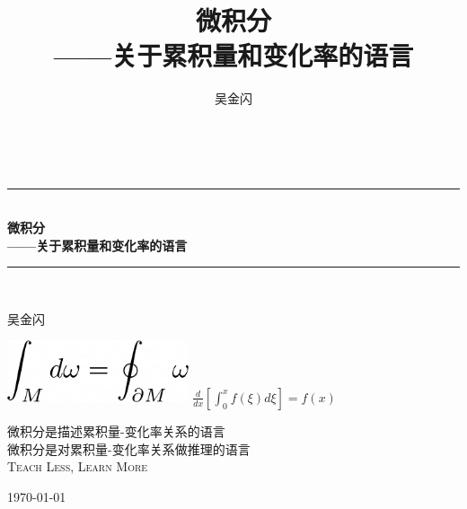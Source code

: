 \documentclass{ctexbook}
\newcommand{\note}[1]{{\color{blue}{#1}}}
\newcommand{\HRule}{\rule{\linewidth}{0.5mm}}
\begin{document}
\title{微积分\\
——关于累积量和变化率的语言}
\author{吴金闪}

\begin{titlepage}
\begin{center}

~

\HRule \\[0.4cm]
{ \huge \bfseries 微积分\\
——关于累积量和变化率的语言 \\[0.4cm] }
\HRule \\[0.5cm]

\begin{center} \Large
吴金闪
\end{center}
\vspace{1cm}
	
\includegraphics[width=0.4\textwidth]{figure/Stokes} \hspace{2cm} $\frac{d}{dx}\left[\int_{0}^{x}f\left(\xi\right)d\xi\right]=f\left(x\right)$
\note{插图化成一个人嘴里说出来这个Stokes公式}

\vspace{1cm}

\textsc{\Large 微积分是描述累积量-变化率关系的语言}\\[0.5cm]

\textsc{\Large 微积分是对累积量-变化率关系做推理的语言}\\[0.5cm]
	
\textsc{\Large Teach Less, Learn More}\\[0.5cm]
	
\vfill

{\large \today}

\end{center}
\end{titlepage}

\tableofcontents


\end{document}
